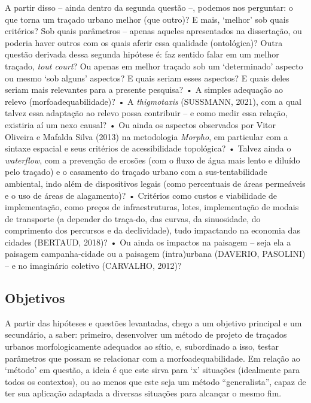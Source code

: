 \documentclass[twoside, 12pt]{book}
\begin{document}
        A partir disso – ainda dentro da segunda questão –, podemos nos perguntar: o que torna um traçado urbano melhor (que outro)? E mais, ‘melhor’ sob quais critérios? Sob quais parâmetros – apenas aqueles apresentados na dissertação, ou poderia haver outros com os quais aferir essa qualidade (ontológica)? Outra questão derivada dessa segunda hipótese é: faz sentido falar em um melhor traçado, \textit{tout court}? Ou apenas em melhor traçado sob um ‘determinado’ aspecto ou mesmo ‘sob alguns’ aspectos? E quais seriam esses aspectos? E quais deles seriam mais relevantes para a presente pesquisa? 
            •	A simples adequação ao relevo (morfoadequabilidade)? 
            •	A \textit{thigmotaxis} (SUSSMANN, 2021), com a qual talvez essa adaptação ao relevo possa contribuir – e como medir essa relação, existiria aí um nexo causal? 
            •	Ou ainda os aspectos observados por Vitor Oliveira e Mafalda Silva (2013) na metodologia \textit{Morpho}, em particular com a sintaxe espacial e seus critérios de acessibilidade topológica? 
            •	Talvez ainda o \textit{waterflow}, com a prevenção de erosões (com o fluxo de água mais lento e diluído pelo traçado) e o casamento do traçado urbano com a sus-tentabilidade ambiental, indo além de dispositivos legais (como percentuais de áreas permeáveis e o uso de áreas de alagamento)? 
            •	Critérios como custos e viabilidade de implementação, como preços de infraestruturas, lotes, implementação de modais de transporte (a depender do traça-do, das curvas, da sinuosidade, do comprimento dos percursos e da declividade), tudo impactando na economia das cidades (BERTAUD, 2018)?
            •	Ou ainda os impactos na paisagem – seja ela a paisagem campanha-cidade ou a paisagem (intra)urbana (DAVERIO, PASOLINI) – e no imaginário coletivo (CARVALHO, 2012)?

    \subsection{Objetivos}	 

        A partir das hipóteses e questões levantadas, chego a um objetivo principal e um secundário, a saber: primeiro, desenvolver um método de projeto de traçados urbanos morfologicamente adequados ao sítio, e, subordinado a isso, testar parâmetros que possam se relacionar com a morfoadequabilidade. Em relação ao ‘método’ em questão, a ideia é que este sirva para ‘x’ situações (idealmente para todos os contextos), ou ao menos que este seja um método “generalista”, capaz de ter sua aplicação adaptada a diversas situações para alcançar o mesmo fim.
\end{document}
